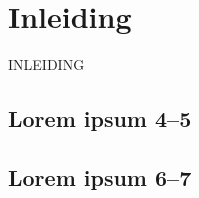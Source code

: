 \chapter{Inleiding}
\label{inleiding}

INLEIDING %

%

\section{Lorem ipsum 4--5}

\section{Lorem ipsum 6--7}

